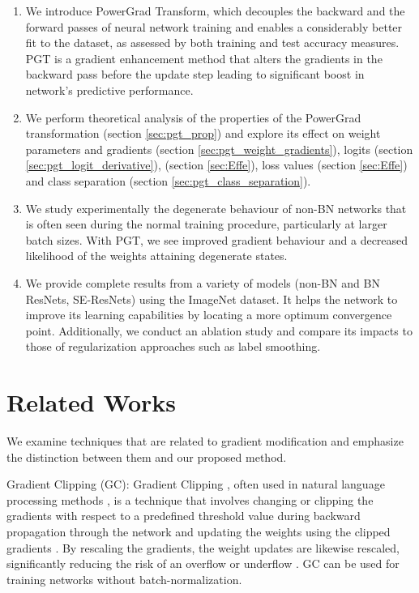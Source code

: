 \documentclass[times,sort&compress]{elsarticle}
\begin{document}
\begin{enumerate}

\item We introduce PowerGrad Transform, which decouples the backward and the forward
passes of neural network training and enables a considerably better fit to the dataset,
as assessed by both training and test accuracy measures. PGT is a gradient enhancement
method that alters the gradients in the backward pass before the update step leading to
significant boost in network's predictive performance.

\item We perform theoretical analysis of the properties of the PowerGrad transformation
(section \ref{sec:pgt_prop}) and explore its effect on weight parameters and gradients
(section \ref{sec:pgt_weight_gradients}), logits (section
\ref{sec:pgt_logit_derivative}), (section \ref{sec:Effe}), loss values (section
\ref{sec:Effe}) and class separation (section \ref{sec:pgt_class_separation}).

\item We study experimentally the degenerate behaviour of non-BN networks that is often
seen during the normal training procedure, particularly at larger batch sizes. With PGT,
we see improved gradient behaviour and a decreased likelihood of the weights attaining
degenerate states.

\item We provide complete results from a variety of models (non-BN and BN ResNets,
SE-ResNets) using the ImageNet dataset. It helps the network to improve its learning
capabilities by locating a more optimum convergence point. Additionally, we conduct an
ablation study and compare its impacts to those of regularization approaches such as
label smoothing.

\end{enumerate}






\section{Related Works}
\label{sec:Rela}




We examine techniques that are related to gradient modification and emphasize the
distinction between them and our proposed method.




Gradient Clipping (GC): Gradient Clipping \cite{pascanu2013difficulty}, often used in
natural language processing methods \cite{merity2017regularizing}, is a technique that
involves changing or clipping the gradients with respect to a predefined threshold value
during backward propagation through the network and updating the weights using the
clipped gradients \cite{zhang2019gradient, smith2020generalization}. By rescaling the
gradients, the weight updates are likewise rescaled, significantly reducing the risk of
an overflow or underflow \cite{pascanu2012understanding}. GC can be used for training
networks without batch-normalization.
\end{document}
